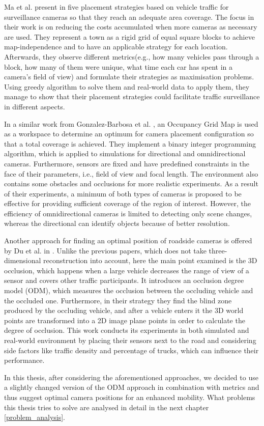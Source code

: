Ma et al. present in \cite{surveillance_related_work} five placement strategies based on vehicle traffic for surveillance cameras so that they reach an adequate area coverage. The focus in their work is on reducing the costs accumulated when more cameras as necessary are used. They represent a town as a rigid grid of equal square blocks to achieve map-independence and to have an applicable strategy for each location. Afterwards, they observe different metrics(e.g., how many vehicles pass through a block, how many of them were unique, what time each car has spent in a camera's field of view) and formulate their strategies as maximisation problems. Using greedy algorithm to solve them and real-world data to apply them, they manage to show that their placement strategies could facilitate traffic surveillance in different aspects. 

In a similar work from Gonzalez-Barbosa et al. \cite{total_coverage_optimum}, an Occupancy Grid Map is used as a workspace to determine an optimum for camera placement configuration so that a total coverage is achieved. They implement a binary integer programming algorithm, which is applied to simulations for directional and omnidirectional cameras. Furthermore, sensors are fixed and have predefined constraints in the face of their parameters, i.e., field of view and focal length. The environment also contains some obstacles and occlusions for more realistic experiments. As a result of their experiments, a minimum of both types of cameras is proposed to be effective for providing sufficient coverage of the region of interest. However, the efficiency of omnidirectional cameras is limited to detecting only scene changes, whereas the directional can identify objects because of better resolution.

Another approach for finding an optimal position of roadside cameras is offered by Du et al. in  \cite{occlusion_degree_model}. Unlike the previous papers, which does not take three-dimensional reconstruction into account, here the main point examined is the 3D occlusion, which happens when a large vehicle decreases the range of view of a sensor and covers other traffic participants. It introduces an occlusion degree model (ODM), which measures the occlusion between the occluding vehicle and the occluded one. Furthermore, in their strategy they find the blind zone produced by the occluding vehicle, and after a vehicle enters it the 3D world points are transformed into a 2D image plane points in order to calculate the degree of occlusion. This work conducts its experiments in both simulated and real-world environment by placing their sensors next to the road and considering side factors like traffic density and percentage of trucks, which can influence their performance.

In this thesis, after considering the aforementioned approaches, we decided to use a slightly changed version of the ODM approach in combination with  metrics and thus suggest optimal camera positions for an enhanced mobility. What problems this thesis tries to solve are analysed in detail in the next chapter \ref{problem_analysis}.
